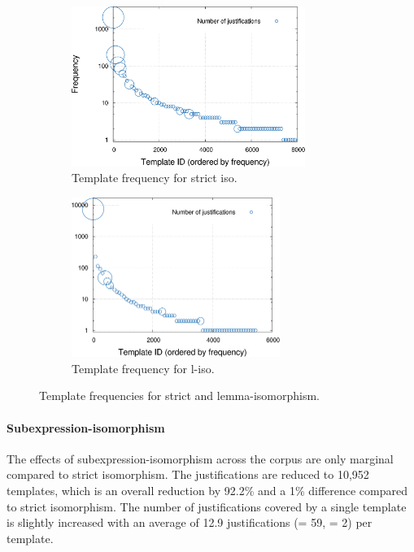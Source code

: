 \begin{figure}
\centering
		\begin{subfigure}{0.5\textwidth}
                \centering
                \includegraphics[height=5.2cm]{plots/iso-template-freq.pdf}
                \caption{Template frequency for strict iso.}
        	\label{fig:iso-freq}
        \end{subfigure}%
		\begin{subfigure}{0.5\textwidth}
                \centering
                \includegraphics[height=5.2cm]{plots/iso-template-freq-lemma.pdf}
                \caption{Template frequency for l-iso.}
        	\label{fig:iso-freq-lemma}
        \end{subfigure}
        \caption{Template frequencies for strict and lemma-isomorphism.}
\end{figure}

\paragraph{Subexpression-isomorphism}
The effects of subexpression-isomorphism across the corpus are only marginal compared to strict isomorphism. The justifications are reduced to 10,952 templates, which is an overall reduction by 92.2\% and a 1\% difference compared to strict isomorphism. The number of justifications covered by a single template is slightly increased with an average of 12.9 justifications (\sdev = 59, \median = 2) per template.

